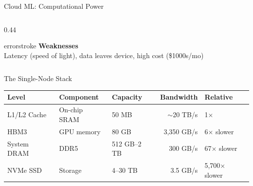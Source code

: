 \documentclass[aspectratio=169, 12pt]{beamer}
\begin{document}
\begin{frame}{Cloud ML: Computational Power}
\begin{columns}[T]
\begin{column}{0.44\textwidth}
    \vspace{0.15cm}
    \begin{mlsyscard}{errorstroke}
    \textbf{Weaknesses}\\
    {\footnotesize Latency (speed of light), data leaves device, high cost (\$1000s/mo)}
    \end{mlsyscard}
  \end{column}
\end{columns}

\end{frame}

\begin{frame}{The Single-Node Stack}
\note{
%
%
%
%
}

\scriptsize
\renewcommand{\arraystretch}{1.05}
\begin{tabular}{@{}lllrl@{}}
  \toprule
  \textbf{Level} & \textbf{Component} & \textbf{Capacity} & \textbf{Bandwidth} & \textbf{Relative} \\
  \midrule
  L1/L2 Cache & On-chip SRAM & 50 MB & $\sim$20 TB/s & 1$\times$ \\
  \textcolor{computestroke}{HBM3} & GPU memory & 80 GB & 3,350 GB/s & 6$\times$ slower \\
  \textcolor{datastroke}{System DRAM} & DDR5 & 512 GB--2 TB & 300 GB/s & 67$\times$ slower \\
  \textcolor{routingstroke}{NVMe SSD} & Storage & 4--30 TB & 3.5 GB/s & 5,700$\times$ slower \\
  \bottomrule
\end{tabular}


\end{frame}
\end{document}
